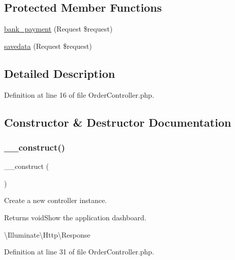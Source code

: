 \subsection*{Protected Member Functions}
\begin{DoxyCompactItemize}
\item 
\mbox{\hyperlink{class_responsive_1_1_http_1_1_controllers_1_1_order_controller_a564457d40f797becf55bfd3578f44241}{bank\+\_\+payment}} (Request \$request)
\item 
\mbox{\hyperlink{class_responsive_1_1_http_1_1_controllers_1_1_order_controller_a39992cc1c190dd16b2de573a70a7f5dc}{savedata}} (Request \$request)
\end{DoxyCompactItemize}


\subsection{Detailed Description}


Definition at line 16 of file Order\+Controller.\+php.



\subsection{Constructor \& Destructor Documentation}
\mbox{\label{class_responsive_1_1_http_1_1_controllers_1_1_order_controller_a095c5d389db211932136b53f25f39685}} 
\subsubsection{\texorpdfstring{\_\_construct()}{\_\_construct()}}
{\footnotesize\ttfamily \+\_\+\+\_\+construct (\begin{DoxyParamCaption}{ }\end{DoxyParamCaption})}

Create a new controller instance.

\begin{DoxyReturn}{Returns}
void\+Show the application dashboard.

\textbackslash{}\+Illuminate\textbackslash{}\+Http\textbackslash{}\+Response 
\end{DoxyReturn}


Definition at line 31 of file Order\+Controller.\+php.



